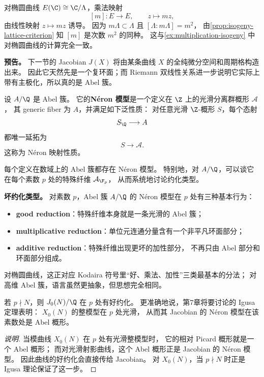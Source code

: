 \begin{example}
\label{ex:elliptic-as-abelian}
对椭圆曲线 $E(\C)\cong \C/\Lambda$，乘法映射
\[
  [m]:E\to E,
  \qquad z\longmapsto mz,
\]
由线性映射 $z\mapsto mz$ 诱导。
因为 $m\Lambda\subset \Lambda$ 且 $[\Lambda:m\Lambda]=m^2$，
由\cref{prop:isogeny-lattice-criterion} 知 $[m]$ 是次数 $m^2$ 的同种。
这与\cref{ex:multiplication-isogeny} 中对椭圆曲线的计算完全一致。
\end{example}

\textbf{预告。}
下一节的 Jacobian $J(X)$ 将由某条曲线 $X$ 的全纯微分空间和周期格构造出来。
因此它天然先是一个复环面；而 Riemann 双线性关系进一步说明它实际上带有主极化，所以真的是 Abel 簇。

\begin{definition}[N\'eron 模型]
\label{def:neron-model-abelian}
设 $A/\Q$ 是 Abel 簇。
它的\textbf{N\'eron 模型}是一个定义在 $\Z$ 上的光滑分离群概形 $\mathcal A$，
其 generic fiber 为 $A$，并满足如下泛性质：
对任意光滑 $\Z$-概形 $S$，每个态射
\[
  S_{\Q}\longrightarrow A
\]
都唯一延拓为
\[
  S\longrightarrow \mathcal A.
\]
这称为 N\'eron 映射性质。
\end{definition}

\begin{theorem}
\label{thm:existence-neron-model}
每个定义在数域上的 Abel 簇都存在 N\'eron 模型。
特别地，对 $A/\Q$，可以谈它在每个素数 $p$ 处的特殊纤维 $\mathcal A_{\F_p}$，
从而系统地讨论约化类型。
\end{theorem}

\textbf{坏约化类型。}
对素数 $p$，Abel 簇 $A/\Q$ 的 N\'eron 模型在 $p$ 处有三种基本行为：
\begin{itemize}
  \item \textbf{good reduction}：特殊纤维本身就是一条光滑的 Abel 簇；
  \item \textbf{multiplicative reduction}：单位元连通分量含有一个非平凡环面部分；
  \item \textbf{additive reduction}：特殊纤维出现更坏的加性部分，
        不再只由 Abel 部分和环面部分组成。
\end{itemize}
对椭圆曲线，这正对应 Kodaira 符号里“好、乘法、加性”三类最基本的分法；
对高维 Abel 簇，语言虽然更抽象，但思想完全相同。

\begin{proposition}
\label{prop:j0n-good-reduction-away-from-level}
若 $p\nmid N$，则 $J_0(N)/\Q$ 在 $p$ 处有好约化。
更准确地说，第7章将要讨论的 Igusa 定理表明：
$X_0(N)$ 的整模型在 $p$ 处光滑，
从而其 Jacobian 的 N\'eron 模型在该素数处是 Abel 概形。
\end{proposition}

\begin{proof}[说明]
当模曲线 $X_0(N)$ 在 $p$ 处有光滑整模型时，
它的相对 Picard 概形就是一个 Abel 概形；
而对光滑射影曲线，这个 Abel 概形正是 Jacobian 的 N\'eron 模型。
因此曲线的好约化会直接传给 Jacobian。
对 $X_0(N)$，当 $p\nmid N$ 时正是 Igusa 理论保证了这一步。
\end{proof}
